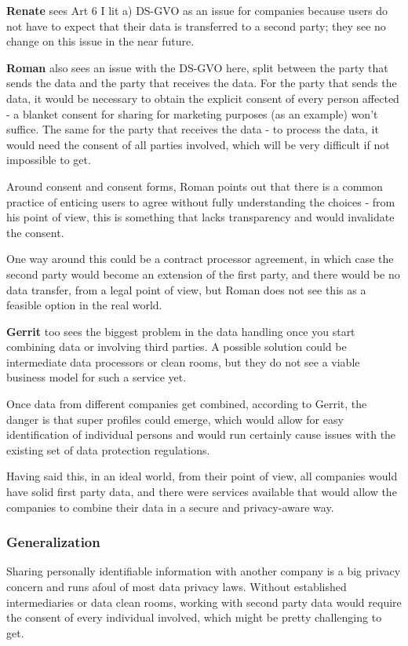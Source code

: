\textbf{Renate} sees Art 6 I lit a) DS-GVO as an issue for companies because users do not have to expect that their data is transferred to a second party; they see no change on this issue in the near future.

\textbf{Roman} also sees an issue with the DS-GVO here, split between the party that sends the data and the party that receives the data. For the party that sends the data, it would be necessary to obtain the explicit consent of every person affected - a blanket consent for sharing for marketing purposes (as an example) won't suffice. The same for the party that receives the data - to process the data, it would need the consent of all parties involved, which will be very difficult if not impossible to get.

Around consent and consent forms, Roman points out that there is a common practice of enticing users to agree without fully understanding the choices - from his point of view, this is something that lacks transparency and would invalidate the consent.

One way around this could be a contract processor agreement, in which case the second party would become an extension of the first party, and there would be no data transfer, from a legal point of view, but Roman does not see this as a feasible option in the real world.

\textbf{Gerrit} too sees the biggest problem in the data handling once you start combining data or involving third parties. A possible solution could be intermediate data processors or clean rooms, but they do not see a viable business model for such a service yet.

Once data from different companies get combined, according to Gerrit, the danger is that super profiles could emerge, which would allow for easy identification of individual persons and would run certainly cause issues with the existing set of data protection regulations.

Having said this, in an ideal world, from their point of view, all companies would have solid first party data, and there were services available that would allow the companies to combine their data in a secure and privacy-aware way. 

\subsubsection{Generalization}

Sharing personally identifiable information with another company is a big privacy concern and runs afoul of most data privacy laws. Without established intermediaries or data clean rooms, working with second party data would require the consent of every individual involved, which might be pretty challenging to get.

